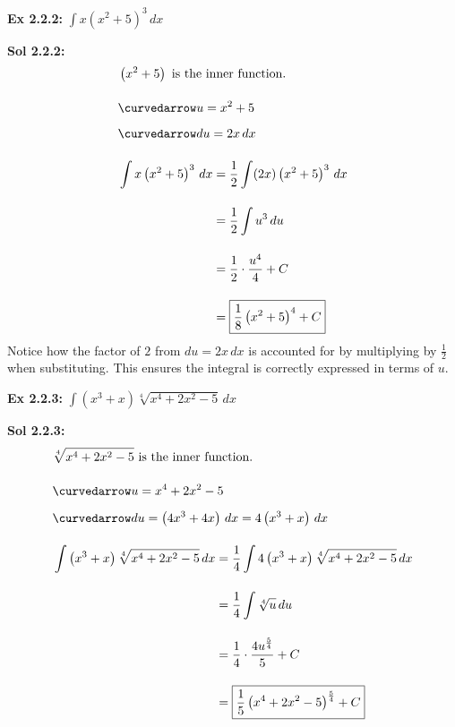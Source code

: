 \begin{tcolorbox}[example]
    \textbf{Ex 2.2.2: } $\int x\left(x^2 + 5\right)^3 \, dx$
\end{tcolorbox}
\begin{tcolorbox}[solution]
    \textbf{Sol 2.2.2: } \begin{align*}
        & \left(x^2 + 5\right) \text{ is the inner function.} \\[11pt]
        & \curvedarrow u = x^2 + 5 \\[5.5pt]
        & \curvedarrow du = 2x \, dx \\[11pt]
        & \int x\left(x^2 + 5\right)^3 \, dx \begin{aligned}[t]
            & = \dfrac{1}{2}\int (2x)\left(x^2 + 5\right)^3 \, dx \\[11pt]
            & = \dfrac{1}{2}\int u^3 \, du \\[11pt]
            & = \dfrac{1}{2} \cdot \dfrac{u^4}{4} + C \\[11pt]
            & = \boxed{\dfrac{1}{8}\left(x^2 + 5\right)^4 + C}
        \end{aligned}
    \end{align*}
    Notice how the factor of $2$ from $du = 2x\,dx$ is accounted for by multiplying by $\frac{1}{2}$ when substituting. This ensures the integral is correctly expressed in terms of $u$.
\end{tcolorbox} \vspace{11pt}

\begin{tcolorbox}[example]
    \textbf{Ex 2.2.3: } $\int \left(x^3 + x\right)\sqrt[4]{x^4 + 2x^2 - 5} \, dx$
\end{tcolorbox}
\begin{tcolorbox}[solution]
    \textbf{Sol 2.2.3: } \begin{align*}
        & \sqrt[4]{x^4 + 2x^2 - 5} \text{ is the inner function.} \\[11pt]
        & \curvedarrow u = x^4 + 2x^2 - 5 \\[5.5pt]
        & \curvedarrow du = \left(4x^3 + 4x\right)\, dx = 4\left(x^3 + x\right) \, dx \\[11pt]
        & \int \left(x^3 + x\right)\sqrt[4]{x^4 + 2x^2 - 5} \, dx \begin{aligned}[t]
            & = \dfrac{1}{4}\int 4\left(x^3 + x\right)\sqrt[4]{x^4 + 2x^2 - 5} \, dx \\[11pt]
            & = \dfrac{1}{4}\int \sqrt[4]{u} \, du \\[11pt]
            & = \dfrac{1}{4} \cdot \dfrac{4u^{\frac{5}{4}}}{5} + C \\[11pt]
            & = \boxed{\dfrac{1}{5}\left(x^4 + 2x^2 - 5\right)^{\frac{5}{4}} + C}
        \end{aligned}
    \end{align*}
\end{tcolorbox} \vspace{11pt}

